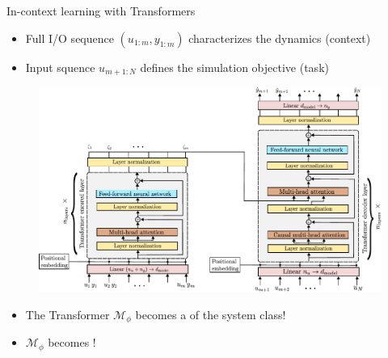 \documentclass{beamer}
\newcommand{\free}{\mathcal{M}}
\begin{document}
\begin{frame}{In-context learning with Transformers}
     \begin{itemize}
     \item Full I/O sequence $(u_{1:m}, y_{1:m})$ characterizes the dynamics (context)
     \item Input squence $u_{m+1:N}$ defines the simulation objective (task) 
     \end{itemize}
     \begin{figure}
          \includegraphics[height=150 pt]{fig/architecture/encoder_decoder_architecture.pdf}
     \end{figure}
     \pause
     \begin{itemize}
     \item The Transformer $\free_\phi$  becomes a   of the system class!
     \item $ \free_\phi$ becomes !
     \end{itemize}
     \end{frame}
     
\end{document}
